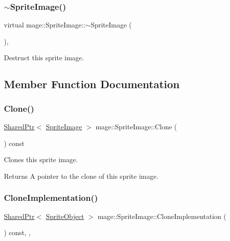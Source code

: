 \subsubsection{\texorpdfstring{$\sim$\+Sprite\+Image()}{~SpriteImage()}}
{\footnotesize\ttfamily virtual mage\+::\+Sprite\+Image\+::$\sim$\+Sprite\+Image (\begin{DoxyParamCaption}{ }\end{DoxyParamCaption})\hspace{0.3cm}{\ttfamily [virtual]}, {\ttfamily [default]}}

Destruct this sprite image. 

\subsection{Member Function Documentation}
\hypertarget{classmage_1_1_sprite_image_a42ccd883d4d4baf3b84f2b251f612a11}{}\label{classmage_1_1_sprite_image_a42ccd883d4d4baf3b84f2b251f612a11} 
\subsubsection{\texorpdfstring{Clone()}{Clone()}}
{\footnotesize\ttfamily \hyperlink{namespacemage_a1e01ae66713838a7a67d30e44c67703e}{Shared\+Ptr}$<$ \hyperlink{classmage_1_1_sprite_image}{Sprite\+Image} $>$ mage\+::\+Sprite\+Image\+::\+Clone (\begin{DoxyParamCaption}{ }\end{DoxyParamCaption}) const}

Clones this sprite image.

\begin{DoxyReturn}{Returns}
A pointer to the clone of this sprite image. 
\end{DoxyReturn}
\hypertarget{classmage_1_1_sprite_image_ab1261e3d33ef4de77523bd9c0920dd54}{}\label{classmage_1_1_sprite_image_ab1261e3d33ef4de77523bd9c0920dd54} 
\subsubsection{\texorpdfstring{Clone\+Implementation()}{CloneImplementation()}}
{\footnotesize\ttfamily \hyperlink{namespacemage_a1e01ae66713838a7a67d30e44c67703e}{Shared\+Ptr}$<$ \hyperlink{classmage_1_1_sprite_object}{Sprite\+Object} $>$ mage\+::\+Sprite\+Image\+::\+Clone\+Implementation (\begin{DoxyParamCaption}{ }\end{DoxyParamCaption}) const\hspace{0.3cm}{\ttfamily [override]}, {\ttfamily [private]}, {\ttfamily [virtual]}}

